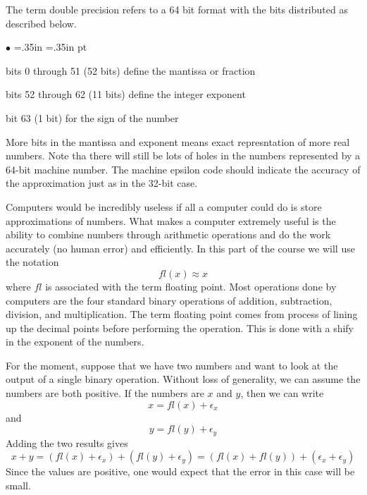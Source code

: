 \documentclass[10pt,fleqn]{article}
\begin{document}
The term double precision refers to a 64 bit format with the bits distributed
as described below.

\begin{list}{$\bullet$}{ \parsep=0pt \listparindent=0pt
\topsep=0pt \rightmargin=.35in \leftmargin=.35in  pt
\itemsep=2pt}
  \item bits 0 through 51 (52 bits) define the mantissa or fraction
  \item bits 52 through 62 (11 bits) define the integer exponent
  \item bit 63 (1 bit) for the sign of the number
\end{list}

More bits in the mantissa and exponent means exact represntation of more real
numbers. Note tha there will still be lots of holes in the numbers represented
by a 64-bit machine number. The machine epsilon code should indicate the
accuracy of the approximation just as in the 32-bit case.

Computers would be incredibly useless if all a computer could do is store
approximations of numbers. What makes a computer extremely useful is the ability
to combine numbers through arithmetic operations and do the work accurately (no
human error) and efficiently. In this part of the course we will use the
notation
\[
  fl(x) \approx x
\]
where $fl$ is associated with the term floating point. Most operations done by
computers are the four standard binary operations of addition, subtraction,
division, and multiplication. The term floating point comes from process of
lining up the decimal points before performing the operation. This is done with
a shify in the exponent of the numbers.

For the moment, suppose that we have two numbers and want to look at the output
of a single binary operation. Without loss of generality, we can assume the
numbers are both positive. If the numbers are $x$ and $y$, then we can write
\[
   x = fl(x) + \epsilon_x
\]
and
\[
   y = fl(y) + \epsilon_y
\]
Adding the two results gives
\[
   x + y = ( fl(x) + \epsilon_x ) + ( fl(y) + \epsilon_y )
         = ( fl(x) + fl(y) ) + ( \epsilon_x + \epsilon_y )
\]
Since the values are positive, one would expect that the error in this case
will be small.
\end{document}
